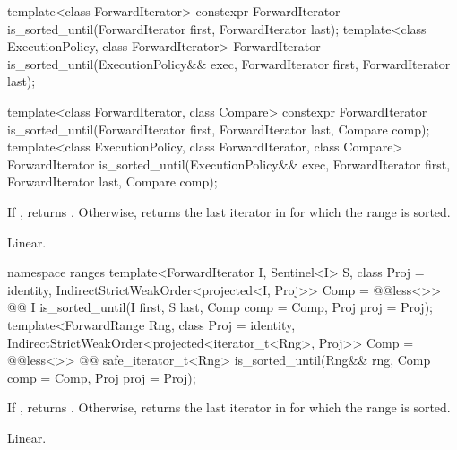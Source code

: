 %
\begin{itemdecl}
template<class ForwardIterator>
  constexpr ForwardIterator
    is_sorted_until(ForwardIterator first, ForwardIterator last);
template<class ExecutionPolicy, class ForwardIterator>
  ForwardIterator
    is_sorted_until(ExecutionPolicy&& exec,
                    ForwardIterator first, ForwardIterator last);

template<class ForwardIterator, class Compare>
  constexpr ForwardIterator
    is_sorted_until(ForwardIterator first, ForwardIterator last,
                    Compare comp);
template<class ExecutionPolicy, class ForwardIterator, class Compare>
  ForwardIterator
    is_sorted_until(ExecutionPolicy&& exec,
                    ForwardIterator first, ForwardIterator last,
                    Compare comp);
\end{itemdecl}

\begin{itemdescr}
\pnum
\returns If , returns
. Otherwise, returns
the last iterator  in  for which the
range  is sorted.

\pnum
\complexity Linear.
\end{itemdescr}

\begin{addedblock}
%
\begin{itemdecl}
namespace ranges {
  template<ForwardIterator I, Sentinel<I> S, class Proj = identity,
      IndirectStrictWeakOrder<projected<I, Proj>> Comp = @@less<>>
    @@ I is_sorted_until(I first, S last, Comp comp = Comp{}, Proj proj = Proj{});
  template<ForwardRange Rng, class Proj = identity,
      IndirectStrictWeakOrder<projected<iterator_t<Rng>, Proj>> Comp = @@less<>>
    @@ safe_iterator_t<Rng>
      is_sorted_until(Rng&& rng, Comp comp = Comp{}, Proj proj = Proj{});
}
\end{itemdecl}

\begin{itemdescr}
\pnum
\returns If , returns
. Otherwise, returns
the last iterator  in  for which the
range  is sorted.

\pnum
\complexity Linear.
\end{itemdescr}
\end{addedblock}

